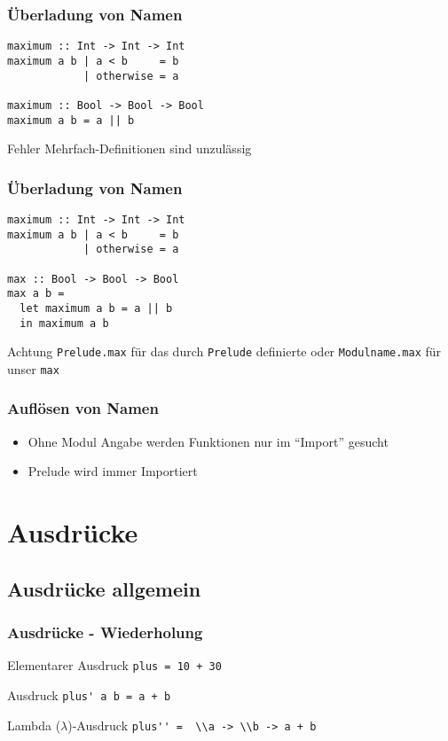 \begin{frame}[fragile]
\frametitle{Überladung von Namen} 
\begin{lstlisting}
maximum :: Int -> Int -> Int
maximum a b | a < b 	= b
            | otherwise = a

maximum :: Bool -> Bool -> Bool
maximum a b = a || b
\end{lstlisting}
\begin{alertblock}{Fehler}
Mehrfach-Definitionen sind unzulässig
\end{alertblock}
\end{frame}

\begin{frame}[fragile]
\frametitle{Überladung von Namen} 
\begin{lstlisting}
maximum :: Int -> Int -> Int
maximum a b | a < b 	= b
            | otherwise = a

max :: Bool -> Bool -> Bool
max a b = 
  let maximum a b = a || b
  in maximum a b
\end{lstlisting}
\begin{alertblock}{Achtung}
\lstinline|Prelude.max| für das durch \lstinline|Prelude| definierte oder \lstinline|Modulname.max| für unser \lstinline|max|
\end{alertblock}
\end{frame}


\begin{frame}
\frametitle{Auflösen von Namen}
\begin{block}{\vspace*{-3ex}}
\begin{itemize}
  \item Ohne Modul Angabe werden Funktionen nur im "`Import"' gesucht
  \item Prelude wird immer Importiert 
\end{itemize}
\end{block}
\end{frame}



\section{Ausdrücke}
\subsection{Ausdrücke allgemein}
\begin{frame}
\frametitle{Ausdrücke - Wiederholung} 
\begin{exampleblock}{Elementarer Ausdruck}
\lstinline|plus = 10 + 30|
\end{exampleblock}
\begin{exampleblock}{Ausdruck}
\lstinline|plus' a b = a + b|
\end{exampleblock}
\begin{exampleblock}{Lambda ($\lambda$)-Ausdruck}
\lstinline|plus'' =  \\a -> \\b -> a + b|
\end{exampleblock}
\end{frame}

